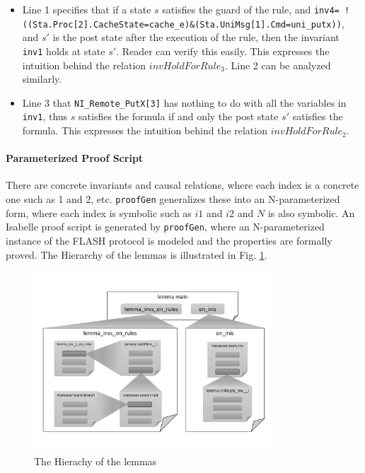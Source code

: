 \documentclass{llncs}
\begin{document}
\begin{itemize}[noitemsep,nolistsep]
\item Line 1 specifies that if a state $s$ satisfies the guard of the rule, and %
  {\tt inv4= !((Sta.Proc[2].CacheState=cache\_e)\&(Sta.UniMsg[1].Cmd=uni\_putx))}, and $s'$ is the post state after the execution of the rule, then the invariant {\tt inv1} holds at state $s'$. Reader can verify this easily. This expresses the intuition behind the  relation $invHoldForRule_3$. Line 2 can be analyzed similarly.
 \item Line 3 that {\tt NI\_Remote\_PutX[3]} has nothing to do with all the variables in {\tt inv1}, thus $s$ satisfies the formula if and only the post state   $s'$ satisfies the formula. This expresses the intuition behind the   relation $invHoldForRule_2$.
\end{itemize}%

\vspace{-10pt}
\paragraph{Parameterized Proof Script} There are concrete invariants and causal relations, where each  index is a concrete one such as 1 and 2, etc. {\tt proofGen} generalizes these into an N-parameterized form, where each index is symbolic such as $i1$ and $i2$ and $N$ is also symbolic. An Isabelle proof script is  generated by {\tt proofGen}, where an N-parameterized instance of the FLASH protocol is modeled   and the properties are formally proved. The Hierarchy of the lemmas is illustrated in Fig. \ref{fig:lemmaHierachy}. %



\begin{figure}[htbp]
\centering %


\includegraphics[width=0.8\textwidth]{thy.pdf}
\vspace{-20pt}
\caption{The Hierachy of the lemmas\label{fig:lemmaHierachy}
}
\end{figure}
\end{document}
